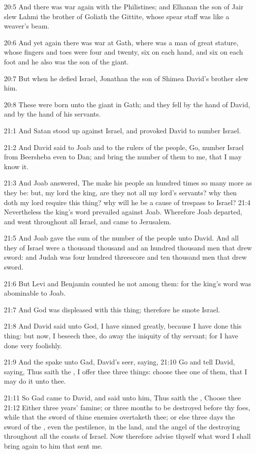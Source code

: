 20:5 And there was war again with the Philistines; and Elhanan the son
of Jair slew Lahmi the brother of Goliath the Gittite, whose spear
staff was like a weaver's beam.

20:6 And yet again there was war at Gath, where was a man of great
stature, whose fingers and toes were four and twenty, six on each
hand, and six on each foot and he also was the son of the giant.

20:7 But when he defied Israel, Jonathan the son of Shimea David's
brother slew him.

20:8 These were born unto the giant in Gath; and they fell by the hand
of David, and by the hand of his servants.

21:1 And Satan stood up against Israel, and provoked David to number
Israel.

21:2 And David said to Joab and to the rulers of the people, Go,
number Israel from Beersheba even to Dan; and bring the number of them
to me, that I may know it.

21:3 And Joab answered, The \LORD make his people an hundred times so
many more as they be: but, my lord the king, are they not all my
lord's servants?  why then doth my lord require this thing? why will
he be a cause of trespass to Israel?  21:4 Nevertheless the king's
word prevailed against Joab. Wherefore Joab departed, and went
throughout all Israel, and came to Jerusalem.

21:5 And Joab gave the sum of the number of the people unto David. And
all they of Israel were a thousand thousand and an hundred thousand
men that drew sword: and Judah was four hundred threescore and ten
thousand men that drew sword.

21:6 But Levi and Benjamin counted he not among them: for the king's
word was abominable to Joab.

21:7 And God was displeased with this thing; therefore he smote
Israel.

21:8 And David said unto God, I have sinned greatly, because I have
done this thing: but now, I beseech thee, do away the iniquity of thy
servant; for I have done very foolishly.

21:9 And the \LORD spake unto Gad, David's seer, saying, 21:10 Go and
tell David, saying, Thus saith the \LORD, I offer thee three things:
choose thee one of them, that I may do it unto thee.

21:11 So Gad came to David, and said unto him, Thus saith the \LORD,
Choose thee 21:12 Either three years' famine; or three months to be
destroyed before thy foes, while that the sword of thine enemies
overtaketh thee; or else three days the sword of the \LORD, even the
pestilence, in the land, and the angel of the \LORD destroying
throughout all the coasts of Israel. Now therefore advise thyself what
word I shall bring again to him that sent me.

